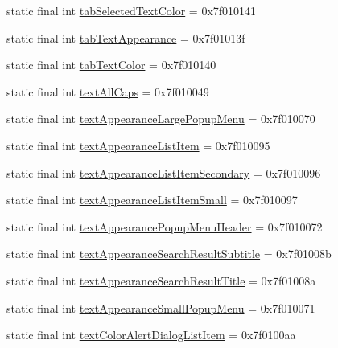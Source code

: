 \begin{CompactItemize}
\item 
static final int \hyperlink{classandroid_1_1support_1_1v7_1_1mediarouter_1_1_r_1_1attr_1c5501ec7a96046c3004d71813fc98ea}{tabSelectedTextColor} = 0x7f010141
\item 
static final int \hyperlink{classandroid_1_1support_1_1v7_1_1mediarouter_1_1_r_1_1attr_6e05cc37152581e6002ac8210f0420c4}{tabTextAppearance} = 0x7f01013f
\item 
static final int \hyperlink{classandroid_1_1support_1_1v7_1_1mediarouter_1_1_r_1_1attr_d1f6ddf8ef37794c67866bb80cbc35ee}{tabTextColor} = 0x7f010140
\item 
static final int \hyperlink{classandroid_1_1support_1_1v7_1_1mediarouter_1_1_r_1_1attr_1fc12be4b736e8d39042b8cde0d601c0}{textAllCaps} = 0x7f010049
\item 
static final int \hyperlink{classandroid_1_1support_1_1v7_1_1mediarouter_1_1_r_1_1attr_ae857c869c80535ba09b3b86d905e93b}{textAppearanceLargePopupMenu} = 0x7f010070
\item 
static final int \hyperlink{classandroid_1_1support_1_1v7_1_1mediarouter_1_1_r_1_1attr_bc4596cc117548b5cc838800857ec0b3}{textAppearanceListItem} = 0x7f010095
\item 
static final int \hyperlink{classandroid_1_1support_1_1v7_1_1mediarouter_1_1_r_1_1attr_14a22cfd59eb911c90b285ace4274217}{textAppearanceListItemSecondary} = 0x7f010096
\item 
static final int \hyperlink{classandroid_1_1support_1_1v7_1_1mediarouter_1_1_r_1_1attr_d75c2f8f97a2fdf53a736d883fb39efd}{textAppearanceListItemSmall} = 0x7f010097
\item 
static final int \hyperlink{classandroid_1_1support_1_1v7_1_1mediarouter_1_1_r_1_1attr_caba9147e66ecaf2fbdbb8b374a930d7}{textAppearancePopupMenuHeader} = 0x7f010072
\item 
static final int \hyperlink{classandroid_1_1support_1_1v7_1_1mediarouter_1_1_r_1_1attr_0f4c88043a5be589cbb589ca45be3cd8}{textAppearanceSearchResultSubtitle} = 0x7f01008b
\item 
static final int \hyperlink{classandroid_1_1support_1_1v7_1_1mediarouter_1_1_r_1_1attr_6c532802f42d6b4a4b5ccd151777849a}{textAppearanceSearchResultTitle} = 0x7f01008a
\item 
static final int \hyperlink{classandroid_1_1support_1_1v7_1_1mediarouter_1_1_r_1_1attr_b4b21bf5fda61523e44b5e6cffd6fb3a}{textAppearanceSmallPopupMenu} = 0x7f010071
\item 
static final int \hyperlink{classandroid_1_1support_1_1v7_1_1mediarouter_1_1_r_1_1attr_9a5f3bde62833f577619e27f7dd000d1}{textColorAlertDialogListItem} = 0x7f0100aa

\end{CompactItemize}
